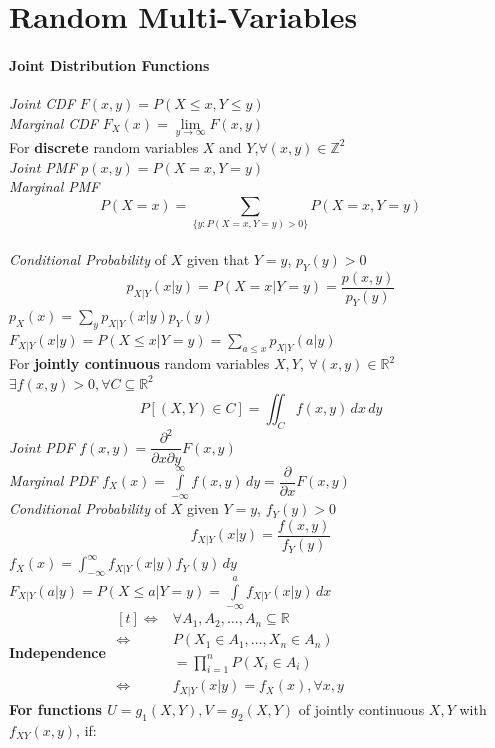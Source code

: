 \section{Random Multi-Variables}
\paragraph{Joint Distribution Functions}
\emph{Joint CDF} $F(x,y)=P(X\le x, Y\le y)$\\
\emph{Marginal CDF} $F_X(x)=\lim\limits_{y\to\infty}F(x,y)$\\
For \textbf{discrete }random variables $X$ and $Y$,$\forall(x,y)\in{\mathbb{Z}}^2$\\
\emph{Joint PMF} $p(x,y)=P(X=x,Y=y)$\\
\emph{Marginal PMF}
\[P(X=x)= \sum\limits_{\{y:P(X=x,Y=y)>0\}}P(X=x,Y=y)\]\\
\emph{Conditional Probability} of $X$ given that $Y=y$, $p_Y(y)>0$
\[p_{X|Y}(x|y)=P(X=x|Y=y)=\frac{p(x,y)}{p_Y(y)}\]
$p_X(x)=\sum\limits_{y}p_{X|Y}(x|y)p_{Y}(y)$\\
$F_{X|Y}(x|y)=P(X\le x|Y=y)=\sum\limits_{a\le x}p_{X|Y}(a|y)$\\
For \textbf{jointly continuous} random variables $X,Y$, $\forall(x,y)\in{\mathbb{R}}^2$\\
$\exists f(x,y)>0,\forall
C\subseteq{\mathbb{R}}^{2}$ \[P[(X,Y)\in C]=\iint_{C}f(x,y)\,dx\,dy\]
\emph{Joint PDF} $f(x,y)=\dfrac{\partial^2}{\partial x\partial y}F(x,y)$\\
\emph{Marginal PDF} $f_X(x)=\int\limits_{-\infty}^{\infty}f(x,y)\,dy=\dfrac{\partial}{\partial x}F(x,y)$\\
\emph{Conditional Probability} of $X$ given $Y=y$, $f_Y(y)>0$
\[f_{X|Y}(x|y)=\frac{f(x,y)}{f_Y(y)}\]
$f_{X}(x)=\int_{-\infty}^{\infty}f_{X|Y}(x|y)f_{Y}(y)\,dy$\\
$F_{X|Y}(a|y)=P(X\le a|Y=y)=\int\limits_{-\infty}^{a}f_{X|Y}(x|y)\,dx$\\
\textbf{Independence }\(\begin{aligned}[t]
  \iff&\forall A_1,A_2,\ldots,A_n\subseteq\mathbb{R}\\
  \iff&P(X_1\in A_1,\ldots,X_n\in A_n)\\
      &=\prod\limits_{i=1}^{n}P(X_i\in A_i)\\
  \iff&f_{X|Y}(x|y)=f_X(x), \forall x,y
\end{aligned}\)\\
\textbf{For functions $U=g_{1}(X,Y), V=g_{2}(X,Y)$} of jointly continuous $X,Y$
with $f_{XY}(x,y)$, if:
